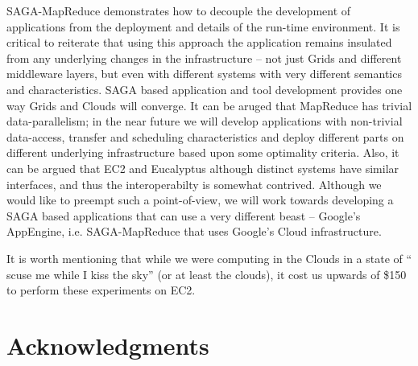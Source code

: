 \documentclass[conference,final]{IEEEtran}
\newcommand{\sagamapreduce }{SAGA-MapReduce }
\begin{document}

\sagamapreduce demonstrates how to decouple the development of
applications from the deployment and details of the run-time
environment.  It is critical to reiterate that using this approach the
application remains insulated from any underlying changes in the
infrastructure -- not just Grids and different middleware layers, but
even with different systems with very different semantics and
characteristics.  SAGA based application and tool development provides
one way Grids and Clouds will converge.  It can be aruged that
MapReduce has trivial data-parallelism; in the near future we will
develop applications with non-trivial data-access, transfer and
scheduling characteristics and deploy different parts on different
underlying infrastructure based upon some optimality criteria.  Also,
it can be argued that EC2 and Eucalyptus although distinct systems
have similar interfaces, and thus the interoperabilty is somewhat
contrived. Although we would like to preempt such a point-of-view, we
will work towards developing a SAGA based applications that can use a
very different beast -- Google's AppEngine, i.e. \sagamapreduce that
uses Google's Cloud infrastructure.

It is worth mentioning that while we were computing in the Clouds in a
state of `` scuse me while I kiss the sky''\cite{purplehaze} (or at
least the clouds), it cost us upwards of \$150 to perform these
experiments on EC2.








\section{Acknowledgments}
\end{document}

